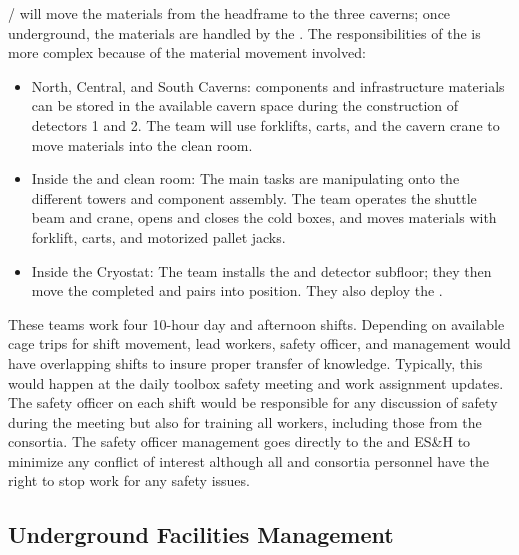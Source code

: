\surf/ will move the  materials from the
headframe to the three caverns; once underground, the materials are handled by the . The responsibilities of the 
 is more complex because of the material
movement involved:
\begin{itemize}
 \item North, Central, and South Caverns:  components and
   infrastructure materials can be stored in the available cavern
   space during the construction of detectors 1 and 2.  The  team will
   use forklifts, carts, and the cavern crane to move
   materials into the clean room.
 \item Inside the  and clean room: The main tasks are manipulating 
   onto the different  towers and  component
   assembly.  The team operates the shuttle beam and crane, opens and closes the
   cold boxes, and moves materials with forklift, carts, and motorized
   pallet jacks.
 \item Inside the Cryostat: The  team installs the  and detector
   subfloor; they then move the completed  and  pairs into
   position.  They also deploy the .
\end{itemize}

These teams work four 10-hour day and afternoon shifts.  Depending on
available cage trips for shift movement, lead workers,
safety officer, and management would have overlapping shifts to insure 
proper transfer of knowledge.  Typically, this would happen at the daily
toolbox safety meeting and work assignment updates.  The safety
officer on each shift would be responsible for any discussion of safety
during the meeting but also for training all workers, including those from
the consortia. The safety officer management goes directly to the \surf
and  ES\&H  to minimize any conflict of interest although 
all  and consortia personnel have the right to stop
work for any safety issues.

\subsection{Underground Facilities Management}

